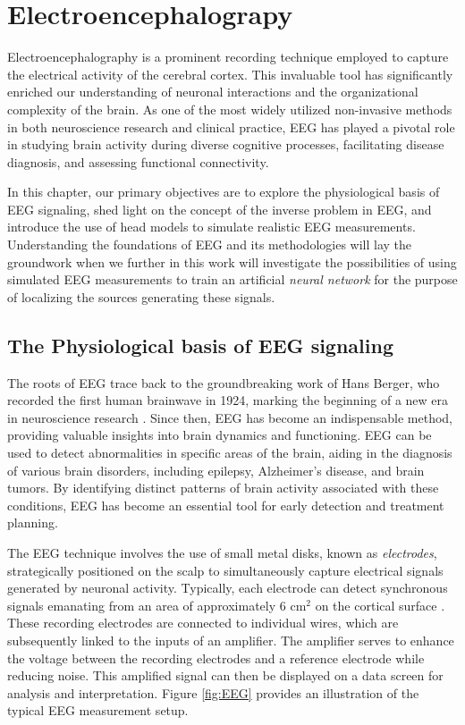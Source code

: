 \documentclass[a4paper, UKenglish, 11pt]{uiomaster}
\begin{document}
\chapter{Electroencephalograpy} \label{chap:eeg}
Electroencephalography is a prominent recording technique employed to capture the electrical activity of the cerebral cortex. This invaluable tool has significantly enriched our understanding of neuronal interactions and the organizational complexity of the brain. As one of the most widely utilized non-invasive methods in both neuroscience research and clinical practice, EEG has played a pivotal role in studying brain activity during diverse cognitive processes, facilitating disease diagnosis, and assessing functional connectivity.

In this chapter, our primary objectives are to explore the physiological basis of EEG signaling, shed light on the concept of the inverse problem in EEG, and introduce the use of head models to simulate realistic EEG measurements. Understanding the foundations of EEG and its methodologies will lay the groundwork when we further in this work will investigate the possibilities of using simulated EEG measurements to train an artificial \emph{neural network} for the purpose of localizing the sources generating these signals.

\section{The Physiological basis of EEG signaling}
The roots of EEG trace back to the groundbreaking work of Hans Berger, who recorded the first human brainwave in 1924, marking the beginning of a new era in neuroscience research \cite{wiki:electroencephalography}. Since then, EEG has become an indispensable method, providing valuable insights into brain dynamics and functioning. EEG can be used to detect abnormalities in specific areas of the brain, aiding in the diagnosis of various brain disorders, including epilepsy, Alzheimer's disease, and brain tumors. By identifying distinct patterns of brain activity associated with these conditions, EEG has become an essential tool for early detection and treatment planning.

The EEG technique involves the use of small metal disks, known as \emph{electrodes}, strategically positioned on the scalp to simultaneously capture electrical signals generated by neuronal activity. Typically, each electrode can detect synchronous signals emanating from an area of approximately 6 cm$^2$ on the cortical surface \cite{bromfield2006introduction}. These recording electrodes are connected to individual wires, which are subsequently linked to the inputs of an amplifier. The amplifier serves to enhance the voltage between the recording electrodes and a reference electrode while reducing noise. This amplified signal can then be displayed on a data screen for analysis and interpretation. Figure \ref{fig:EEG} provides an illustration of the typical EEG measurement setup. 
\end{document}
